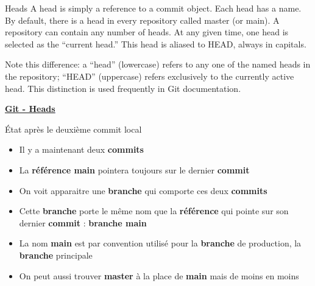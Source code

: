 \documentclass[a4paper,11pt]{beamer}
\begin{document}
\begin{frame}
\begin{alertblock}{Heads}
\justifying
A head is simply a reference to a commit object. Each head has a name. By default, there is a head in every repository called master (or main). A repository can contain any number of heads. At any given time, one head is selected as the “current head.” This head is aliased to HEAD, always in capitals.

Note this difference: a “head” (lowercase) refers to any one of the named heads in the repository; “HEAD” (uppercase) refers exclusively to the currently active head. This distinction is used frequently in Git documentation.
\end{alertblock}
\centering
\textcolor{blue}{
\textbf{\underline{\href{https://www.cduan.com/technical/git/git-1.shtml\#heads}{Git - Heads}}}}
\end{frame}

\begin{frame}
\begin{block}{État après le deuxième commit local}
\centering
{}
\begin{itemize}
	\item Il y a maintenant deux \textbf{commits}
	\item La \textbf{référence main} pointera toujours sur le dernier \textbf{commit}
	\item On voit apparaitre une \textbf{branche} qui comporte ces deux \textbf{commits}
	\item Cette \textbf{branche} porte le même nom que la \textbf{référence} qui pointe sur son dernier \textbf{commit} : \textbf{branche main}
	\item La nom \textbf{main} est par convention utilisé pour la \textbf{branche} de production, la \textbf{branche} principale
	\item On peut aussi trouver \textbf{master} à la place de \textbf{main} mais de moins en moins
\end{itemize}
\end{block}
\end{frame}
\end{document}
